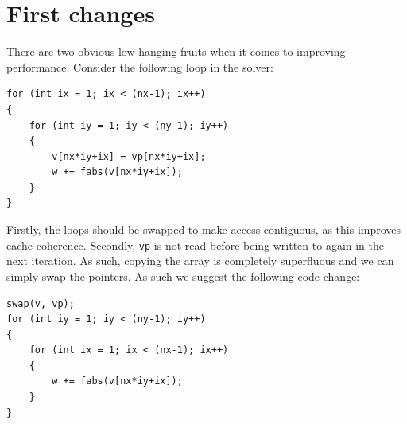 \section{First changes}
There are two obvious low-hanging fruits when it comes to improving performance. Consider the following loop in the solver:

\begin{lstlisting}
for (int ix = 1; ix < (nx-1); ix++)
{
    for (int iy = 1; iy < (ny-1); iy++)
    {
        v[nx*iy+ix] = vp[nx*iy+ix];
        w += fabs(v[nx*iy+ix]);
    }
}
\end{lstlisting}

Firstly, the loops should be swapped to make access contiguous, as this improves cache coherence. Secondly, \texttt{vp} is not read before being written to again in the next iteration.
As such, copying the array is completely superfluous and we can simply swap the pointers. As such we suggest the following code change:

\begin{lstlisting}
swap(v, vp);
for (int iy = 1; iy < (ny-1); iy++)
{
    for (int ix = 1; ix < (nx-1); ix++)
    {
        w += fabs(v[nx*iy+ix]);
    }
}
\end{lstlisting}

